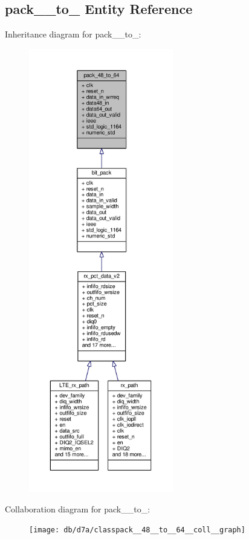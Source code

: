 \subsection{pack\+\_\+\_\+to\+\_ Entity Reference}
\label{classpack__48__to__64}


Inheritance diagram for pack\+\_\+\_\+to\+\_\+:\nopagebreak
\begin{figure}[H]
\begin{center}
\leavevmode
\includegraphics[height=550pt]{d2/d55/classpack__48__to__64__inherit__graph}
\end{center}
\end{figure}


Collaboration diagram for pack\+\_\+\_\+to\+\_\+:\nopagebreak
\begin{figure}[H]
\begin{center}
\leavevmode
\texttt{[image: db/d7a/classpack\_\_48\_\_to\_\_64\_\_coll\_\_graph]}
\end{center}
\end{figure}
